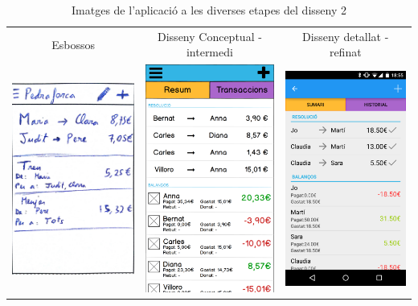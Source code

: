 \begin{table}
\begin{tabular}{| c | c | c |}
\hline
Esbossos & Disseny Conceptual - intermedi & Disseny detallat - refinat \\
\includegraphics[width=50mm]{1_Group.jpg} &
\includegraphics[width=50mm]{2_Group.png} &
\includegraphics[width=50mm]{3_Group.png}  \\
\hline
\end{tabular}
\caption{Imatges de l'aplicació a les diverses etapes del disseny 2}
\label{table:images_app2}
\end{table}

